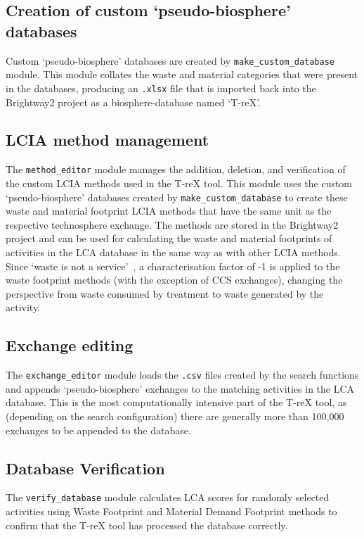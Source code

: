 \documentclass{article}
\renewcommand{\texttt}[1]{{\ttfamily\small\nolinkurl{#1}}}
\begin{document}
\subsection{Creation of custom `pseudo-biosphere' databases}
Custom `pseudo-biosphere' databases are created by \texttt{make\_custom\_database} module. This module collates the waste and material categories that were present in the databases, producing an \texttt{.xlsx} file that is imported back into the Brightway2 project as a biosphere-database named `T-reX'. 

\subsection{LCIA method management}
The \texttt{method\_editor} module manages the addition, deletion, and verification of the custom LCIA methods used in the T-reX tool. This module uses the custom `pseudo-biosphere' databases created by \texttt{make\_custom\_database} to create these waste and material footprint LCIA methods that have the same unit as the respective technosphere exchange. The methods are stored in the Brightway2 project and can be used for calculating the waste and material footprints of activities in the LCA database in the same way as with other LCIA methods. Since `waste is not a service'~\citep{guinee2021wasteisnotaservice}, a characterisation factor of -1 is applied to the waste footprint methods (with the exception of CCS exchanges), changing the perspective from waste consumed by treatment to waste generated by the activity.

\subsection{Exchange editing}
The \texttt{exchange\_editor} module loads the \texttt{.csv} files created by the search functions and appends `pseudo-biosphere' exchanges to the matching activities in the LCA database. This is the most computationally intensive part of the T-reX tool, as (depending on the search configuration) there are generally more than 100,000 exchanges to be appended to the database. 

\subsection{Database Verification}
The \texttt{verify\_database} module calculates LCA scores for randomly selected activities using Waste Footprint and Material Demand Footprint methods to confirm that the T-reX tool has processed the database correctly.
\end{document}
